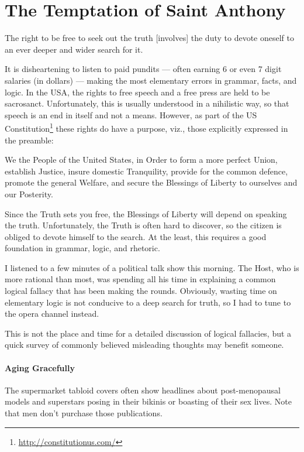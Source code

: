 \section{The Temptation of Saint Anthony}

\begin{quotex}
The right to be free to seek out the truth [involves] the duty to devote oneself to an ever deeper and wider search for it. 

\end{quotex} 

It is disheartening to listen to paid pundits — often earning 6 or even 7 digit salaries (in dollars) — making the most elementary errors in grammar, facts, and logic. In the USA, the rights to free speech and a free press are held to be sacrosanct. Unfortunately, this is usually understood in a nihilistic way, so that speech is an end in itself and not a means. However, as part of the US Constitution\footnote{\url{http://constitutionus.com/}} these rights do have a purpose, viz., those explicitly expressed in the preamble:

\begin{quotex}
We the People of the United States, in Order to form a more perfect Union, establish Justice, insure domestic Tranquility, provide for the common defence, promote the general Welfare, and secure the Blessings of Liberty to ourselves and our Posterity.

\end{quotex}
Since the Truth sets you free, the Blessings of Liberty will depend on speaking the truth. Unfortunately, the Truth is often hard to discover, so the citizen is obliged to devote himself to the search. At the least, this requires a good foundation in grammar, logic, and rhetoric.

I listened to a few minutes of a political talk show this morning. The Host, who is more rational than most, was spending all his time in explaining a common logical fallacy that has been making the rounds. Obviously, wasting time on elementary logic is not conducive to a deep search for truth, so I had to tune to the opera channel instead.

This is not the place and time for a detailed discussion of logical fallacies, but a quick survey of commonly believed misleading thoughts may benefit someone.

\paragraph{Aging Gracefully}
The supermarket tabloid covers often show headlines about post-menopausal models and superstars posing in their bikinis or boasting of their sex lives. Note that men don't purchase those publications.

